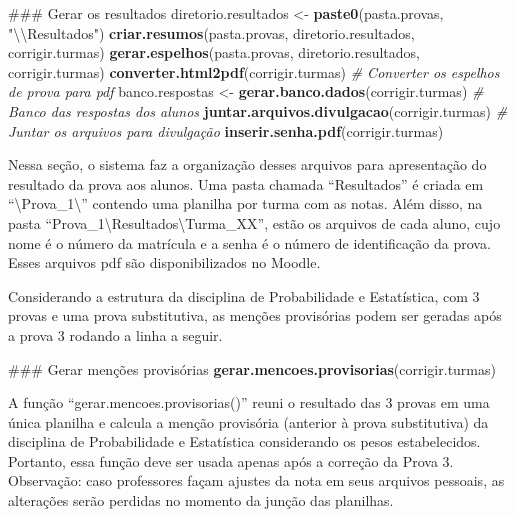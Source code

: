 \documentclass[a4paper]{report}
\newenvironment{Shaded}{\begin{snugshade}}{\end{snugshade}}
\newcommand{\KeywordTok}[1]{\textcolor[rgb]{0.13,0.29,0.53}{\textbf{#1}}}
\newcommand{\CharTok}[1]{\textcolor[rgb]{0.31,0.60,0.02}{#1}}
\newcommand{\StringTok}[1]{\textcolor[rgb]{0.31,0.60,0.02}{#1}}
\newcommand{\CommentTok}[1]{\textcolor[rgb]{0.56,0.35,0.01}{\textit{#1}}}
\newcommand{\NormalTok}[1]{#1}
\begin{document}
\begin{Shaded}
\begin{Highlighting}[]
\NormalTok{### Gerar os resultados}
\NormalTok{diretorio.resultados <-}\StringTok{ }\KeywordTok{paste0}\NormalTok{(pasta.provas, }\StringTok{"}\CharTok{\textbackslash{}\textbackslash{}}\StringTok{Resultados"}\NormalTok{) }
\KeywordTok{criar.resumos}\NormalTok{(pasta.provas, diretorio.resultados, corrigir.turmas)}
\KeywordTok{gerar.espelhos}\NormalTok{(pasta.provas, diretorio.resultados, corrigir.turmas)}
\KeywordTok{converter.html2pdf}\NormalTok{(corrigir.turmas)  }\CommentTok{# Converter os espelhos de prova para pdf }
\NormalTok{banco.respostas <-}\StringTok{ }\KeywordTok{gerar.banco.dados}\NormalTok{(corrigir.turmas)  }\CommentTok{# Banco das respostas dos alunos}
\KeywordTok{juntar.arquivos.divulgacao}\NormalTok{(corrigir.turmas)  }\CommentTok{# Juntar os arquivos para divulgação}
\KeywordTok{inserir.senha.pdf}\NormalTok{(corrigir.turmas)}
\end{Highlighting}
\end{Shaded}

Nessa seção, o sistema faz a organização desses arquivos para
apresentação do resultado da prova aos alunos. Uma pasta chamada
``Resultados'' é criada em ``\textbackslash{}Prova\_1\textbackslash{}''
contendo uma planilha por turma com as notas. Além disso, na pasta
``Prova\_1\textbackslash{}Resultados\textbackslash{}Turma\_XX'', estão
os arquivos de cada aluno, cujo nome é o número da matrícula e a senha é
o número de identificação da prova. Esses arquivos pdf são
disponibilizados no Moodle.

Considerando a estrutura da disciplina de Probabilidade e Estatística,
com 3 provas e uma prova substitutiva, as menções provisórias podem ser
geradas após a prova 3 rodando a linha a seguir.

\begin{Shaded}
\begin{Highlighting}[]
\NormalTok{### Gerar menções provisórias}
\KeywordTok{gerar.mencoes.provisorias}\NormalTok{(corrigir.turmas)}
\end{Highlighting}
\end{Shaded}

A função ``gerar.mencoes.provisorias()'' reuni o resultado das 3 provas
em uma única planilha e calcula a menção provisória (anterior à prova
substitutiva) da disciplina de Probabilidade e Estatística considerando
os pesos estabelecidos. Portanto, essa função deve ser usada apenas após
a correção da Prova 3. Observação: caso professores façam ajustes da
nota em seus arquivos pessoais, as alterações serão perdidas no momento
da junção das planilhas.
\end{document}

